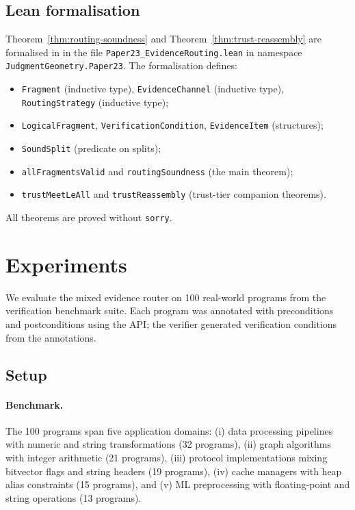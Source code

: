 \documentclass[11pt]{article}
\providecommand{\numroute}{100}
\begin{document}
\subsection{Lean formalisation}\label{sec:lean}

Theorem~\ref{thm:routing-soundness} and Theorem~\ref{thm:trust-reassembly}
are formalised in \LEAN{} in the file \texttt{Paper23\_EvidenceRouting.lean}
in namespace \texttt{JudgmentGeometry.Paper23}.  The formalisation
defines:
\begin{itemize}
  \item \texttt{Fragment} (inductive type), \texttt{EvidenceChannel}
    (inductive type), \texttt{RoutingStrategy} (inductive type);
  \item \texttt{LogicalFragment}, \texttt{VerificationCondition},
    \texttt{EvidenceItem} (structures);
  \item \texttt{SoundSplit} (predicate on splits);
  \item \texttt{allFragmentsValid} and \texttt{routingSoundness}
    (the main theorem);
  \item \texttt{trustMeetLeAll} and \texttt{trustReassembly}
    (trust-tier companion theorems).
\end{itemize}
All theorems are proved without \texttt{sorry}.

\section{Experiments}\label{sec:experiments}

We evaluate the mixed evidence router on \numroute{} real-world
\Python{} programs from the \JuGeo{} verification benchmark suite.
Each program was annotated with preconditions and postconditions using
the \JuGeo{} API; the verifier generated verification conditions from
the annotations.

\subsection{Setup}\label{sec:exp-setup}

\paragraph{Benchmark.}
The \numroute{} programs span five application domains: (i) data
processing pipelines with numeric and string transformations
(32 programs), (ii) graph algorithms with integer arithmetic
(21 programs), (iii) protocol implementations mixing bitvector flags
and string headers (19 programs), (iv) cache managers with heap
alias constraints (15 programs), and (v) ML preprocessing with
floating-point and string operations (13 programs).
\end{document}
